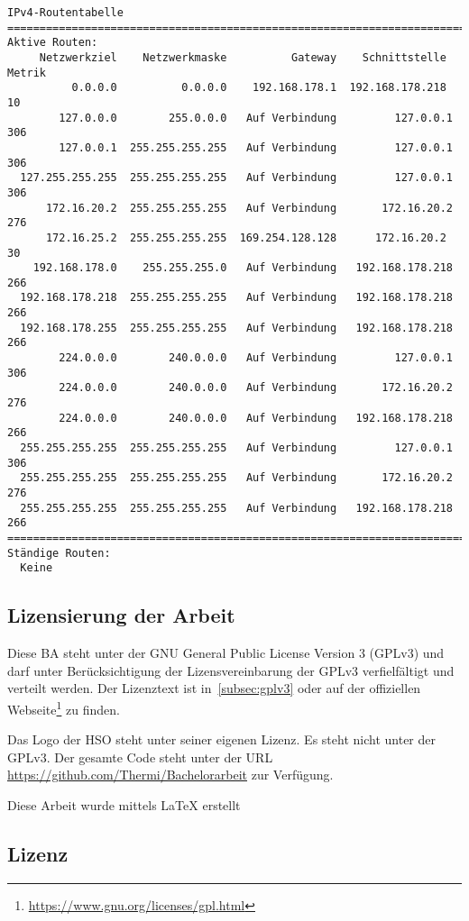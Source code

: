 \begin{lstlisting}[caption=Ausgabe von ipconfig und route -4 print,label=lst:ipconfigroute4]
IPv4-Routentabelle
===========================================================================
Aktive Routen:
     Netzwerkziel    Netzwerkmaske          Gateway    Schnittstelle Metrik
          0.0.0.0          0.0.0.0    192.168.178.1  192.168.178.218     10
        127.0.0.0        255.0.0.0   Auf Verbindung         127.0.0.1    306
        127.0.0.1  255.255.255.255   Auf Verbindung         127.0.0.1    306
  127.255.255.255  255.255.255.255   Auf Verbindung         127.0.0.1    306
      172.16.20.2  255.255.255.255   Auf Verbindung       172.16.20.2    276
      172.16.25.2  255.255.255.255  169.254.128.128      172.16.20.2     30
    192.168.178.0    255.255.255.0   Auf Verbindung   192.168.178.218    266
  192.168.178.218  255.255.255.255   Auf Verbindung   192.168.178.218    266
  192.168.178.255  255.255.255.255   Auf Verbindung   192.168.178.218    266
        224.0.0.0        240.0.0.0   Auf Verbindung         127.0.0.1    306
        224.0.0.0        240.0.0.0   Auf Verbindung       172.16.20.2    276
        224.0.0.0        240.0.0.0   Auf Verbindung   192.168.178.218    266
  255.255.255.255  255.255.255.255   Auf Verbindung         127.0.0.1    306
  255.255.255.255  255.255.255.255   Auf Verbindung       172.16.20.2    276
  255.255.255.255  255.255.255.255   Auf Verbindung   192.168.178.218    266
===========================================================================
Ständige Routen:
  Keine

\end{lstlisting}
\subsection{Lizensierung der Arbeit}
Diese \ac{BA} steht unter der GNU General Public License Version 3 (GPLv3)
und darf unter Berücksichtigung der Lizensvereinbarung der GPLv3 verfielfältigt
und verteilt werden. Der Lizenztext ist in~\autoref{subsec:gplv3} oder 
auf der offiziellen Webseite\footnote{\url{https://www.gnu.org/licenses/gpl.html}}
zu finden.

Das Logo der \ac{HSO} steht unter seiner eigenen Lizenz. Es steht nicht unter der GPLv3.
Der gesamte Code steht unter der URL \url{https://github.com/Thermi/Bachelorarbeit} zur Verfügung.

\begin{centering} 

Diese Arbeit wurde mittels \LaTeX{} erstellt
\end{centering}

\subsection{Lizenz}
\label{subsec:gplv3}

